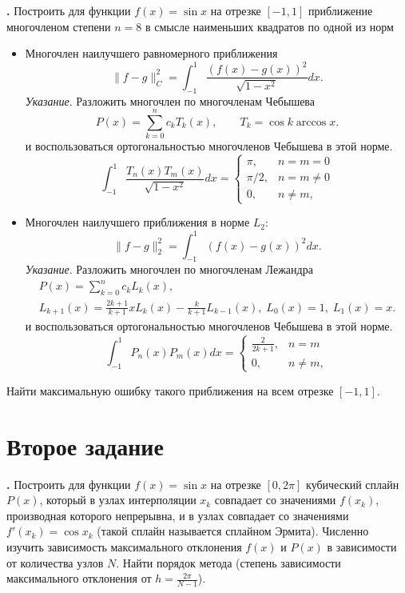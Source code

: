 \documentclass[12pt]{article}
\newcounter{task}
\newcommand{\problem}{\par\textbf{\stepcounter{task}\thetask. }}
\begin{document}
\problem Построить для функции $f(x) = \sin x$ на отрезке $[-1, 1]$
приближение многочленом степени $n = 8$ в смысле наименьших квадратов по одной из норм
\begin{itemize}
\item Многочлен наилучшего равномерного приближения
\[
\|f - g\|_C^2 = \int_{-1}^1 \frac{(f(x) - g(x))^2}{\sqrt{1-x^2}} dx.
\]
\emph{Указание}. Разложить многочлен по многочленам Чебышева
\[
P(x) = \sum_{k=0}^n c_k T_k(x), \qquad
T_k = \cos k \arccos x.
\]
и воспользоваться ортогональностью многочленов Чебышева в этой норме.
\[
\int_{-1}^1 \frac{T_n(x) T_m(x)}{\sqrt{1-x^2}} dx = \begin{cases}
\pi, & n = m = 0\\
\pi/2, & n = m \neq 0\\
0, & n \neq m,
\end{cases}
\]
\item Многочлен наилучшего приближения в норме $L_2$:
\[
\|f - g\|_2^2 = \int_{-1}^1 (f(x) - g(x))^2 dx.
\]
\emph{Указание}. Разложить многочлен по многочленам Лежандра
\begin{gather*}
P(x) = \sum_{k=0}^n c_k L_k(x), \\
L_{k+1}(x) = \frac{2k+1}{k+1} x L_k(x) - \frac{k}{k+1} L_{k-1}(x), \;
L_0(x) = 1,\; L_1(x) = x.
\end{gather*}
и воспользоваться ортогональностью многочленов Чебышева в этой норме.
\[
\int_{-1}^1 P_n(x) P_m(x) dx = \begin{cases}
\frac{2}{2k+1}, & n = m\\
0, & n \neq m,
\end{cases}
\]
\end{itemize}
Найти максимальную ошибку такого приближения на всем отрезке $[-1, 1]$.

\section{Второе задание}

\problem Построить для функции $f(x) = \sin x$ на отрезке $[0, 2\pi]$ кубический
сплайн $P(x)$, который в узлах интерполяции $x_k$ совпадает со значениями $f(x_k)$,
производная которого непрерывна, и в узлах совпадает со значениями $f'(x_k) =
\cos x_k$ (такой сплайн называется сплайном Эрмита). Численно изучить зависимость
максимального отклонения $f(x)$ и $P(x)$ в зависимости от количества узлов $N$.
Найти порядок метода (степень зависимости максимального отклонения от
$h = \frac{2\pi}{N - 1}$).
\end{document}
